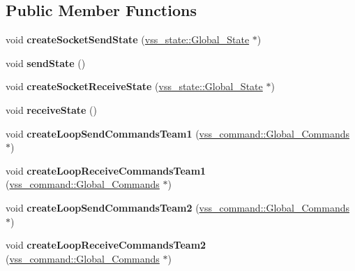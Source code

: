 \subsection*{Public Member Functions}
\begin{DoxyCompactItemize}
\item 
\hypertarget{classInterface_a76752c5d305865777405fd8f36e4b9fd}{void {\bfseries create\-Socket\-Send\-State} (\hyperlink{classvss__state_1_1Global__State}{vss\-\_\-state\-::\-Global\-\_\-\-State} $\ast$)}\label{classInterface_a76752c5d305865777405fd8f36e4b9fd}

\item 
\hypertarget{classInterface_a9de875408d6ec60ef952d167ab244819}{void {\bfseries send\-State} ()}\label{classInterface_a9de875408d6ec60ef952d167ab244819}

\item 
\hypertarget{classInterface_ad7466b43bc53a4cd5225c280cf81b2cc}{void {\bfseries create\-Socket\-Receive\-State} (\hyperlink{classvss__state_1_1Global__State}{vss\-\_\-state\-::\-Global\-\_\-\-State} $\ast$)}\label{classInterface_ad7466b43bc53a4cd5225c280cf81b2cc}

\item 
\hypertarget{classInterface_abba50a9d10639aa5b2f4a45be31b4062}{void {\bfseries receive\-State} ()}\label{classInterface_abba50a9d10639aa5b2f4a45be31b4062}

\item 
\hypertarget{classInterface_a856aa7ba2462cb787bff454998ac03fa}{void {\bfseries create\-Loop\-Send\-Commands\-Team1} (\hyperlink{classvss__command_1_1Global__Commands}{vss\-\_\-command\-::\-Global\-\_\-\-Commands} $\ast$)}\label{classInterface_a856aa7ba2462cb787bff454998ac03fa}

\item 
\hypertarget{classInterface_a9421fb07f3190cff0ab4198587de4b87}{void {\bfseries create\-Loop\-Receive\-Commands\-Team1} (\hyperlink{classvss__command_1_1Global__Commands}{vss\-\_\-command\-::\-Global\-\_\-\-Commands} $\ast$)}\label{classInterface_a9421fb07f3190cff0ab4198587de4b87}

\item 
\hypertarget{classInterface_a59f5b2b5043433cbd42729baf84533e1}{void {\bfseries create\-Loop\-Send\-Commands\-Team2} (\hyperlink{classvss__command_1_1Global__Commands}{vss\-\_\-command\-::\-Global\-\_\-\-Commands} $\ast$)}\label{classInterface_a59f5b2b5043433cbd42729baf84533e1}

\item 
\hypertarget{classInterface_aff3b574fe1147f93011c1deef6ec5505}{void {\bfseries create\-Loop\-Receive\-Commands\-Team2} (\hyperlink{classvss__command_1_1Global__Commands}{vss\-\_\-command\-::\-Global\-\_\-\-Commands} $\ast$)}\label{classInterface_aff3b574fe1147f93011c1deef6ec5505}


\end{DoxyCompactItemize}
